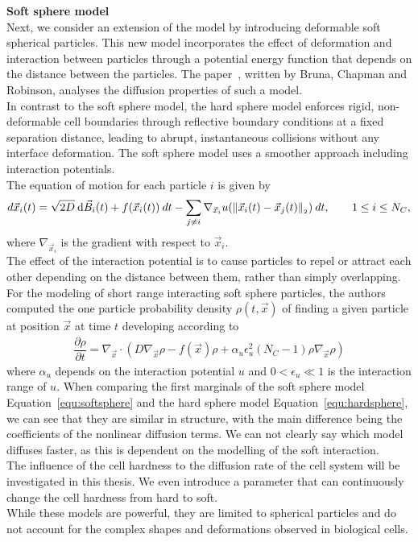 \textbf{Soft sphere model} \\
Next, we consider an extension of the model by introducing deformable soft spherical particles. 
This new model incorporates the effect of deformation and interaction between particles through a potential energy function that depends on the distance between the particles.
The paper~\cite{Bruna2017}, written by Bruna, Chapman and Robinson, analyses the diffusion properties of such a model. \\
In contrast to the soft sphere model, the hard sphere model enforces rigid, non-deformable cell boundaries through reflective boundary conditions at a fixed separation distance, leading to abrupt, instantaneous collisions without any interface deformation. 
The soft sphere model uses a smoother approach including interaction potentials. \\
The equation of motion for each particle $i$ is given by
\begin{align*}
	d\vec{x}_i(t) = \sqrt{2D} \: \dequ \vec{B}_i(t) + f(\vec{x}_i(t))\: dt - \sum\limits_{j\neq i} \nabla_{\vec{x}_i} u (\norm[ \vec{x}_i(t) - \vec{x}_j(t)]) \: dt, \qquad 1 \leq i \leq N_C,
\end{align*}
where $\nabla_{\vec{x}_i}$ is the gradient with respect to $\vec{x}_i$. \\
The effect of the interaction potential is to cause particles to repel or attract each other depending on the distance between them, rather than simply overlapping. \\
For the modeling of short range interacting soft sphere particles, the authors computed the one particle probability density $\rho(t, \vec{x})$ of finding a given particle at position $\vec{x}$ at time $t$ developing according to
\begin{align}
	\dfrac{\partial \rho}{\partial t} = \nabla_{\vec{x}} \cdot (D \nabla_{\vec{x}} \rho - f(\vec{x}) \rho + \alpha_u \epsilon_u^2(N_C-1)\rho \nabla_{\vec{x}} \rho)
	\label{equ:softsphere}
\end{align}
where $\alpha_u$ depends on the interaction potential $u$ and $0 < \epsilon_u \ll 1$ is the interaction range of $u$.
When comparing the first marginals of the soft sphere model Equation~\eqref{equ:softsphere} and the hard sphere model Equation~\eqref{equ:hardsphere}, we can see that they are similar in structure, with the main difference being the coefficients of the nonlinear diffusion terms. 
We can not clearly say which model diffuses faster, as this is dependent on the modelling of the soft interaction. \\
The influence of the cell hardness to the diffusion rate of the cell system will be investigated in this thesis. 
We even introduce a parameter that can continuously change the cell hardness from hard to soft. \\
While these models are powerful, they are limited to spherical particles and do not account for the complex shapes and deformations observed in biological cells.  \\



